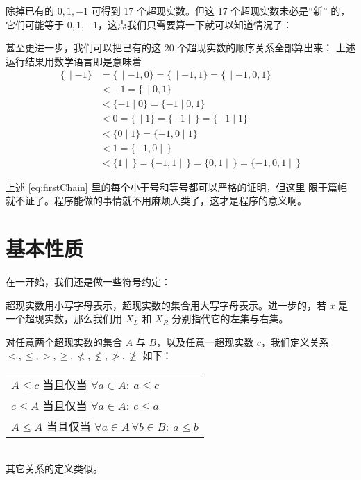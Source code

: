 \documentclass[cs4size,a4paper,adobefonts]{ctexart}
\numberwithin{equation}{section}
\begin{document}
除掉已有的 $0,1,-1$ 可得到 17 个超现实数。但这 17 个超现实数未必是“新”
的，它们可能等于 $0,1,-1$，这点我们只需要算一下就可以知道情况了：

甚至更进一步，我们可以把已有的这 20 个超现实数的顺序关系全部算出来：
上述运行结果用数学语言即是意味着
\begin{equation}
  \label{eq:firstChain}
  \begin{split}
    \{\,\mid-1\} &=\{\,\mid-1,0\}=\{\,\mid-1,1\}=\{\,\mid-1,0,1\} \\
    &< -1 =\{\,\mid0,1\}\\
    &< \{-1\mid0\}=\{-1\mid0,1\}\\
    &< 0=\{\,\mid1\}=\{-1\mid\,\}=\{-1\mid1\}\\
    &< \{0\mid1\}=\{-1,0\mid1\}\\
    &< 1=\{-1,0\mid\,\}\\
    &< \{1\mid\,\}=\{-1,1\mid\,\}=\{0,1\mid\,\}=\{-1,0,1\mid\,\}
  \end{split}
\end{equation}

上述 \eqref{eq:firstChain} 里的每个小于号和等号都可以严格的证明，但这里
限于篇幅就不证了。程序能做的事情就不用麻烦人类了，这才是程序的意义啊。

\section{基本性质}

在一开始，我们还是做一些符号约定：
\begin{symbolDef}
  超现实数用小写字母表示，超现实数的集合用大写字母表示。进一步的，若
  $x$ 是一个超现实数，那么我们用 $X_L$ 和 $X_R$ 分别指代它的左集与右集。
\end{symbolDef}
\begin{symbolDef}
  对任意两个超现实数的集合 $A$ 与 $B$，以及任意一超现实数 $c$，我们定义关系
  $<,\leq,>,\geq,\nless,\nleq,\ngtr,\ngeq$ 如下：
  
  \begin{tabular}{l}
    $A\leq c$ 当且仅当 $\forall a \in A:\: a \leq c$\\
    $c\leq A$ 当且仅当 $\forall a \in A:\: c \leq a$\\
    $A\leq A$ 当且仅当 $\forall a \in A\, \forall b \in B:\: a\leq b$\\
  \end{tabular}\\
其它关系的定义类似。
\end{symbolDef}
\end{document}

